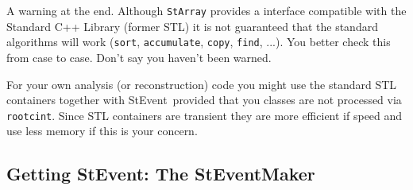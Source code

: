 \documentclass[twoside]{article}
\newcommand{\StEvent}{\textsf{StEvent}}
\begin{document}
A warning at the end. Although \texttt{StArray} provides a interface
compatible with the Standard C++ Library (former STL) it is not
guaranteed that the standard algorithms will work (\texttt{sort},
\texttt{accumulate}, \texttt{copy}, \texttt{find}, ...). You better
check this from case to case. Don't say you haven't been warned.

For your own analysis (or reconstruction) code you might use the
standard STL containers together with \StEvent\ provided that you
classes are not processed via \texttt{rootcint}. Since STL containers
are transient they are more efficient if speed and use less memory if
this is your concern.

\subsection{Getting StEvent: The StEventMaker}
\label{sec:StEventMaker}
\end{document}
